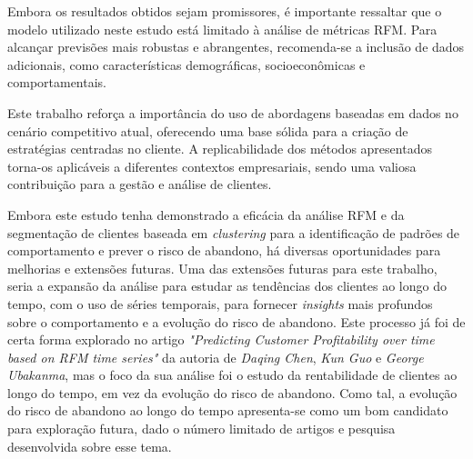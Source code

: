 \documentclass{easychair}
\begin{document}
Embora os resultados obtidos sejam promissores, é importante ressaltar que o modelo utilizado neste estudo está limitado à análise de métricas RFM. Para alcançar previsões mais robustas e abrangentes, recomenda-se a inclusão de dados adicionais, como características demográficas, socioeconômicas e comportamentais.

Este trabalho reforça a importância do uso de abordagens baseadas em dados no cenário competitivo atual, oferecendo uma base sólida para a criação de estratégias centradas no cliente. A replicabilidade dos métodos apresentados torna-os aplicáveis a diferentes contextos empresariais, sendo uma valiosa contribuição para a gestão e análise de clientes.

Embora este estudo tenha demonstrado a eficácia da análise RFM e da segmentação de clientes baseada em \textit{clustering} para a identificação de padrões de comportamento e prever o risco de abandono, há diversas oportunidades para melhorias e extensões futuras. Uma das extensões futuras para este trabalho, seria a expansão da análise para estudar as tendências dos clientes ao longo do tempo, com o uso de séries temporais, para fornecer \textit{insights} mais profundos sobre o comportamento e a evolução do risco de abandono. Este processo já foi de certa forma explorado no artigo \textit{"Predicting Customer Profitability over time based on RFM time series"} da autoria de \textit{Daqing Chen}, \textit{Kun Guo} e \textit{George Ubakanma}, mas o foco da sua análise foi o estudo da rentabilidade de clientes ao longo do tempo, em vez da evolução do risco de abandono. Como tal, a evolução do risco de abandono ao longo do tempo apresenta-se como um bom candidato para exploração futura, dado o número limitado de artigos e pesquisa desenvolvida sobre esse tema.

\newpage


\end{document}
